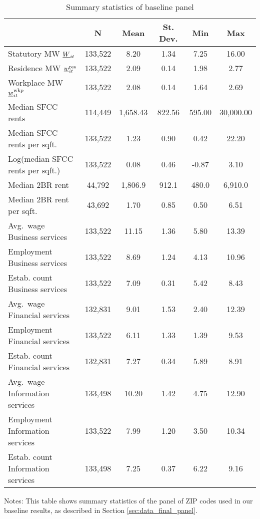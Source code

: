 \begin{table}[hbt!] \centering
    \caption{Summary statistics of baseline panel}
    \label{tab:stats_est_panel}
    \begin{tabular}{@{}lccccc@{}}
        \toprule
                                          & \multicolumn{1}{c}{N} 
                                          & \multicolumn{1}{c}{Mean} 
                                          & \multicolumn{1}{c}{St. Dev.} 
                                          & \multicolumn{1}{c}{Min} 
                                          & \multicolumn{1}{c}{Max}                 \\ \midrule
        Statutory MW $\underline{W}_{it}$           & 133,522  & 8.20  & 1.34  & 7.25  & 16.00  \\
        Residence MW $\underline{w}^{\text{res}}_{it}$    & 133,522  & 2.09  & 0.14  & 1.98  & 2.77  \\
        Workplace MW $\underline{w}^{\text{wkp}}_{it}$    & 133,522  & 2.08  & 0.14  & 1.64  & 2.69  \\
        Median SFCC rents                 & 114,449  & 1,658.43  & 822.56  & 595.00  & 30,000.00  \\
        Median SFCC rents per sqft.       & 133,522  & 1.23  & 0.90  & 0.42  & 22.20  \\
        Log(median SFCC rents per sqft.)  & 133,522  & 0.08  & 0.46  & -0.87  & 3.10  \\
        Median 2BR rent                   & 44,792   & 1,806.9 & 912.1 & 480.0 & 6,910.0  \\
        Median 2BR rent per sqft.         & 43,692   & 1.70  & 0.85  & 0.50  & 6.51  \\
        Avg.\ wage Business services      & 133,522  & 11.15  & 1.36  & 5.80  & 13.39  \\
        Employment Business services      & 133,522  & 8.69  & 1.24  & 4.13  & 10.96  \\
        Estab. count Business services    & 133,522  & 7.09  & 0.31  & 5.42  & 8.43  \\
        Avg.\ wage Financial services     & 132,831  & 9.01  & 1.53  & 2.40  & 12.39  \\
        Employment Financial services     & 133,522  & 6.11  & 1.33  & 1.39  & 9.53  \\
        Estab. count Financial services   & 132,831  & 7.27  & 0.34  & 5.89  & 8.91  \\
        Avg.\ wage Information services   & 133,498  & 10.20  & 1.42  & 4.75  & 12.90  \\
        Employment Information services   & 133,522  & 7.99  & 1.20  & 3.50  & 10.34  \\
        Estab. count Information services & 133,498  & 7.25  & 0.37  & 6.22  & 9.16  \\ \bottomrule
    \end{tabular}

    \begin{minipage}{.95\textwidth} \footnotesize
        \vspace{2mm}
        Notes: This table shows summary statistics of the panel of ZIP codes 
        used in our baseline results, as described in Section 
        \ref{sec:data_final_panel}.
    \end{minipage}
\end{table}
